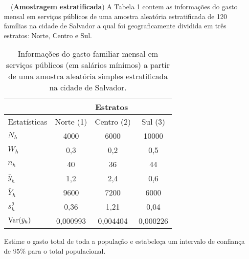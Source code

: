 \documentclass[a4paper,11pt,oneside,onecolumn]{Config/milktest}
\begin{document}
	
	\medskip 
	\question~~({\bf Amostragem estratificada}) A Tabela \ref{tab:2} contem as informações do gasto mensal em serviços públicos de uma amostra aleatória estratificada de 120 famílias na cidade de Salvador a qual foi geograficamente dividida em três estratos: Norte, Centro e Sul.
	
	\begin{table}[!htb]
		\begin{tabular}{l|ccc}
			& \multicolumn{3}{c}{Estratos}   \\ \hline
			Estatísticas & Norte (1)   & Centro (2) & Sul (3)      \\ \hline
			$N_h$        & 4000     & 6000     & 10000    \\
			$W_h$        & 0,3      & 0,2      & 0,5      \\
			$n_h$        & 40       & 36       & 44       \\
			$\bar{y}_h$  & 1,2      & 2,4      & 0,6      \\
			$\bar{Y}_h$  & 9600     & 7200     & 6000     \\
			$s^2_h$             & 0,36     & 1,21     & 0,04     \\
			${\rm Var}(\bar{y}_h)$          & 0,000993 & 0,004404 & 0,000226 \\ \hline
		\end{tabular}
		\caption{Informações do gasto familiar mensal em serviços públicos (em salários mínimos) a partir de uma amostra aleatória simples estratificada na cidade de Salvador.}
		\label{tab:2}
	\end{table}
	
	Estime o  gasto total de toda a população e estabeleça um intervalo de confiança de 95\% para o total populacional.
	
	
	
	
	
	
%	
%	
%	
	
			
			
	
	
	
	
	
	
\end{document}
